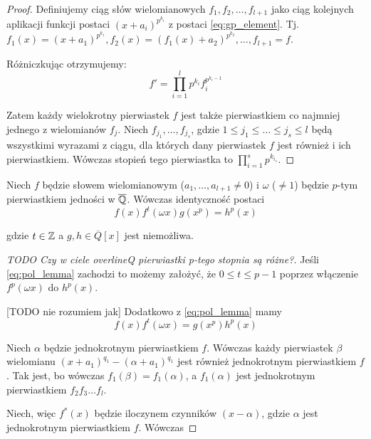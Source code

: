 \begin{proof}
Definiujemy ciąg słów wielomianowych $f_1, f_2, \ldots, f_{l+1}$ jako ciąg
kolejnych aplikacji funkcji postaci $(x+a_i)^{p^{k_i}}$ z postaci
\ref{eq:gp_element}. Tj. $f_1(x) = \left(x + a_1\right)^{p^{k_1}},
f_2(x) = \left(f_1(x) + a_2\right)^{p^{k_2}}, \ldots, f_{l+1} = f$.

Różniczkując otrzymujemy:
\[f' = \prod_{i=1}^l p^{k_i} f_i^{p^{k_i - 1}}\]

Zatem każdy wielokrotny pierwiastek $f$ jest także pierwiastkiem co najmniej
jednego z wielomianów $f_j$. Niech $f_{j_1}, \ldots, f_{j_s}$, gdzie $1 \leq j_1
\leq \ldots \leq j_s \leq l$ będą wszystkimi wyrazami z ciągu, dla których dany
pierwiastek $f$ jest również i ich pierwiastkiem. Wówczas stopień tego
pierwiastka to $\prod_{i=1}^s p^{k_{i_s}}$.
\end{proof}

\begin{lemma}
  Niech $f$ będzie słowem wielomianowym ($a_1, \ldots, a_{l+1} \neq 0$) i
  $\omega$ ($\neq 1$) będzie $p$-tym pierwiastkiem jedności w $\overline{\mathbb{Q}}$.
  Wówczas identyczność postaci
  \begin{equation}
    f(x)f^t(\omega x)g\left(x^p\right) = h^p(x)
    \label{eq:pol_lemma}
  \end{equation}

  gdzie $t \in \mathbb{Z}$ a $g, h \in \overline{Q}[x]$ jest niemożliwa.
\end{lemma}

\begin{proof}
  [TODO Czy w ciele overlineQ pierwiastki p-tego stopnia są różne?]

  Jeśli \ref{eq:pol_lemma} zachodzi to możemy założyć, że $0 \leq t \leq p - 1$
  poprzez włączenie $f^p(\omega x)$ do $h^p(x)$. 

  [TODO nie rozumiem jak] Dodatkowo z \ref{eq:pol_lemma} mamy
  \begin{equation}
    f(x)f^t(\omega x) = g\left(x^p\right)h^p(x)
    \label{eq:pol_lemma_right}
  \end{equation}

  Niech $\alpha$ będzie jednokrotnym pierwiastkiem $f$. Wówczas każdy
  pierwiastek $\beta$ wielomianu $\left(x + a_1\right)^{q_1} - \left(\alpha +
  a_1\right)^{q_1}$ jest również jednokrotnym pierwiastkiem $f$. Tak jest, bo
  wówczas $f_1(\beta) = f_1(\alpha)$, a $f_1(\alpha)$ jest jednokrotnym
  pierwiastkiem $f_2f_3 \ldots f_{l}$.

  Niech, więc $f^*(x)$ będzie iloczynem czynników $(x-\alpha)$, gdzie $\alpha$
  jest jednokrotnym pierwiastkiem $f$. Wówczas
\end{proof}









